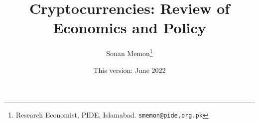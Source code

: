 \documentclass[12pt]{article}
\newcommand{\1}{\mathbbm 1}
\begin{document}
	
	
	
	
	

\vspace{-0.5ex}







\newpage{}



	
	\title{{Cryptocurrencies: Review of Economics and Policy  %
			}}
		
	
			
			\date{This version: June 2022}%
		
		
		\author{Sonan Memon\footnote{Research Economist, PIDE, Islamabad. \texttt{smemon@pide.org.pk}}}
		
		
		
		\newpage{}
		
		\maketitle
		\vspace{-2ex}
		
		

		

	
	
	
		
\end{document}

